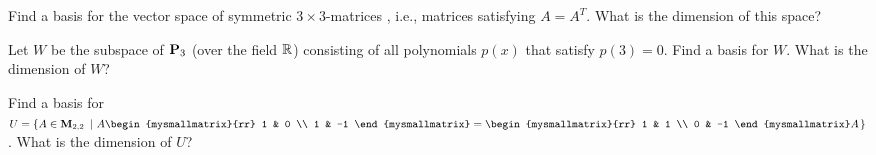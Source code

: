 \begin{ex}
  Find a basis for the vector space of symmetric $3\times 3$-matrices%
  , i.e., matrices satisfying $A=A^T$.
  What is the dimension of this space?
\end{ex}

\begin{ex}
  Let $W$ be the subspace of $\mathbf{P}_3$ (over the field $\mathbb{R}$)
  consisting of all polynomials $p(x)$ that satisfy $p(3)=0$.
  Find a basis for $W$. What is the dimension of $W$?
\end{ex}

\begin{ex}
  Find a basis for
  $U=\set{A\in\Mat_{2,2} ~\left\vert~ A\begin{mysmallmatrix}{rr} 1 &
        0 \\ 1 & -1 \end{mysmallmatrix} = \begin{mysmallmatrix}{rr} 1
        & 1 \\ 0 & -1 \end{mysmallmatrix} A \right.}$.  What is the
  dimension of $U$?
\end{ex}

